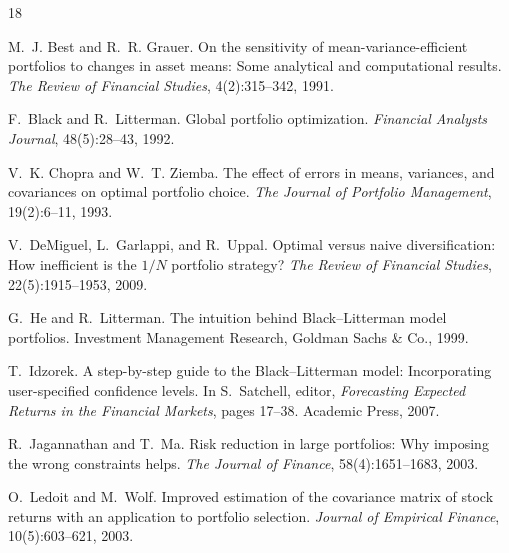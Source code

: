 \documentclass[a4paper,11pt]{article}
\theoremstyle{plain}
\theoremstyle{definition}
\begin{document}

\begin{thebibliography}{18}

M.~J. Best and R.~R. Grauer.
\newblock On the sensitivity of mean-variance-efficient portfolios to
changes in asset means: Some analytical and computational results.
\newblock \emph{The Review of Financial Studies}, 4(2):315--342, 1991.

F.~Black and R.~Litterman.
\newblock Global portfolio optimization.
\newblock \emph{Financial Analysts Journal}, 48(5):28--43, 1992.

V.~K. Chopra and W.~T. Ziemba.
\newblock The effect of errors in means, variances, and covariances on
optimal portfolio choice.
\newblock \emph{The Journal of Portfolio Management}, 19(2):6--11, 1993.

V.~DeMiguel, L.~Garlappi, and R.~Uppal.
\newblock Optimal versus naive diversification: How inefficient is the
$1/N$ portfolio strategy?
\newblock \emph{The Review of Financial Studies}, 22(5):1915--1953, 2009.

G.~He and R.~Litterman.
\newblock The intuition behind Black--Litterman model portfolios.
\newblock Investment Management Research, Goldman Sachs \& Co., 1999.

T.~Idzorek.
\newblock A step-by-step guide to the Black--Litterman model:
Incorporating user-specified confidence levels.
\newblock In S.~Satchell, editor, \emph{Forecasting Expected Returns in
the Financial Markets}, pages 17--38. Academic Press, 2007.

R.~Jagannathan and T.~Ma.
\newblock Risk reduction in large portfolios: Why imposing the wrong
constraints helps.
\newblock \emph{The Journal of Finance}, 58(4):1651--1683, 2003.

O.~Ledoit and M.~Wolf.
\newblock Improved estimation of the covariance matrix of stock returns
with an application to portfolio selection.
\newblock \emph{Journal of Empirical Finance}, 10(5):603--621, 2003.


\end{thebibliography}
\end{document}
